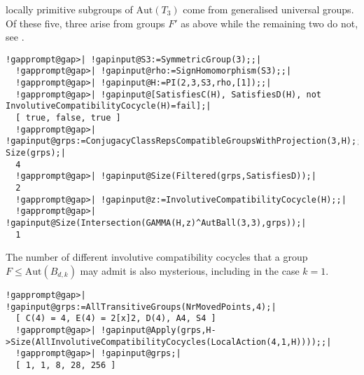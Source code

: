 \documentclass[a4paper,11pt]{report}
\begin{document}
{{locally primitive subgroups of $\mathrm{Aut}(T_{3})$ come from generalised universal groups. Of these five, three arise from groups $F'$ as above while the remaining two do not, see \cite[Example 4.39]{Tor20}. 
\begin{Verbatim}[commandchars=!@|,fontsize=\small,frame=single,label=Example]
  !gapprompt@gap>| !gapinput@S3:=SymmetricGroup(3);;|
  !gapprompt@gap>| !gapinput@rho:=SignHomomorphism(S3);;|
  !gapprompt@gap>| !gapinput@H:=PI(2,3,S3,rho,[1]);;|
  !gapprompt@gap>| !gapinput@[SatisfiesC(H), SatisfiesD(H), not InvolutiveCompatibilityCocycle(H)=fail];|
  [ true, false, true ]
  !gapprompt@gap>| !gapinput@grps:=ConjugacyClassRepsCompatibleGroupsWithProjection(3,H);; Size(grps);|
  4
  !gapprompt@gap>| !gapinput@Size(Filtered(grps,SatisfiesD));|
  2
  !gapprompt@gap>| !gapinput@z:=InvolutiveCompatibilityCocycle(H);;|
  !gapprompt@gap>| !gapinput@Size(Intersection(GAMMA(H,z)^AutBall(3,3),grps));|
  1
\end{Verbatim}
 The number of different involutive compatibility cocycles that a group $F\le\mathrm{Aut}(B_{d,k})$ may admit is also mysterious, including in the case $k=1$. 
\begin{Verbatim}[commandchars=!@|,fontsize=\small,frame=single,label=Example]
  !gapprompt@gap>| !gapinput@grps:=AllTransitiveGroups(NrMovedPoints,4);|
  [ C(4) = 4, E(4) = 2[x]2, D(4), A4, S4 ]
  !gapprompt@gap>| !gapinput@Apply(grps,H->Size(AllInvolutiveCompatibilityCocycles(LocalAction(4,1,H))));;|
  !gapprompt@gap>| !gapinput@grps;|
  [ 1, 1, 8, 28, 256 ]
\end{Verbatim}
 

}}
\end{document}
